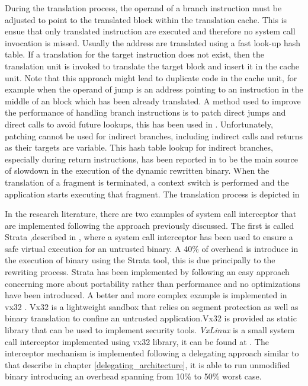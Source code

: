 During the translation process, the operand of a branch instruction must be adjusted to point to the translated block within the translation cache. This is ensue that only translated instruction are executed and therefore no system call invocation is missed. Usually the address are translated using a fast look-up hash table. 
If a translation for the target instruction does not exist, then the translation unit is invoked to translate the target block and insert it in the cache unit. Note that this approach might lead to duplicate code in the cache unit, for example when the operand of jump is an address pointing to an instruction in the middle of an block which has been already translated. A method used to improve the performance of handling branch instructions is to patch direct jumps and direct calls to avoid future lookups, this has been used in \cite{vx32, DynamoRio}. Unfortunately, patching cannot be used for indirect branches, including indirect calls and returns as their targets are variable. This hash table lookup for indirect branches, especially during return instructions, has been reported in \cite{vx32} to be the main source of slowdown in the execution of the dynamic rewritten binary. When the translation of a fragment is terminated, a context switch is performed and the application starts executing that fragment. The translation process is depicted in 


In the research literature, there are two examples of system call interceptor that are implemented following the approach previously discussed. The first is called Strata ,described in \cite{Strata}, where a system call interceptor has been used to ensure a safe virtual execution for an untrusted binary.  A 40\% of overhead is introduce in the execution of binary using the Strata tool, this is due principally to the rewriting process.  Strata has been implemented by following an easy approach concerning more about portability rather than performance and no optimizations have been introduced. A better and more complex example is implemented in vx32 \cite{vx32}. Vx32 is a lightweight sandbox that relies on segment protection as well as binary translation to confine an untrusted application.Vx32 is provided as static library that can be used to implement security tools. \emph{VxLinux} is a small system call interceptor implemented using vx32 library, it can be found at \cite{soft:vx32}. The interceptor mechanism is implemented following a delegating approach similar to that describe in chapter \ref{delegating_architecture}, it is able to run unmodified binary introducing an overhead spanning from 10\% to 50\% worst case. 




